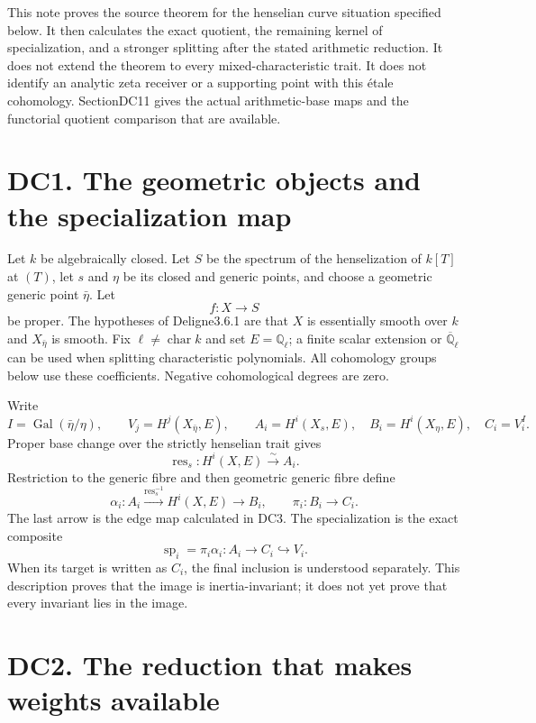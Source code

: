 \documentclass[
]{report}
\begin{document}
This note proves the source theorem for the henselian curve situation
specified below. It then calculates the exact quotient, the remaining
kernel of specialization, and a stronger splitting after the stated
arithmetic reduction. It does not extend the theorem to every
mixed-characteristic trait. It does not identify an analytic zeta
receiver or a supporting point with this étale cohomology. SectionDC11
gives the actual arithmetic-base maps and the functorial quotient
comparison that are available.

\section{DC1. The geometric objects and the specialization
map}\label{dc1.-the-geometric-objects-and-the-specialization-map}

Let \(k\) be algebraically closed. Let \(S\) be the spectrum of the
henselization of \(k[T]\) at \((T)\), let \(s\) and \(\eta\) be its
closed and generic points, and choose a geometric generic point
\(\bar\eta\). Let \[
f:X\longrightarrow S
\tag{DC1.1}
\] be proper. The hypotheses of Deligne3.6.1 are that \(X\) is
essentially smooth over \(k\) and \(X_{\bar\eta}\) is smooth. Fix
\(\ell\ne\operatorname{char}k\) and set \(E=\mathbb Q_\ell\); a finite
scalar extension or \(\overline{\mathbb Q}_\ell\) can be used when
splitting characteristic polynomials. All cohomology groups below use
these coefficients. Negative cohomological degrees are zero.

Write \[
I=\operatorname{Gal}(\bar\eta/\eta),\qquad
V_j=H^j(X_{\bar\eta},E),\qquad
A_i=H^i(X_s,E),\quad B_i=H^i(X_\eta,E),\quad C_i=V_i^I.
\tag{DC1.2}
\] Proper base change over the strictly henselian trait gives \[
\operatorname{res}_s:H^i(X,E)\xrightarrow{\sim}A_i.
\tag{DC1.3}
\] Restriction to the generic fibre and then geometric generic fibre
define \[
\alpha_i:A_i\xrightarrow{\operatorname{res}_s^{-1}}H^i(X,E)
 \longrightarrow B_i,
\qquad
\pi_i:B_i\longrightarrow C_i.
\tag{DC1.4}
\] The last arrow is the edge map calculated in DC3. The specialization
is the exact composite \[
\operatorname{sp}_i=\pi_i\alpha_i:A_i\longrightarrow C_i
 \hookrightarrow V_i.
\tag{DC1.5}
\] When its target is written as \(C_i\), the final inclusion is
understood separately. This description proves that the image is
inertia-invariant; it does not yet prove that every invariant lies in
the image.

\section{DC2. The reduction that makes weights
available}\label{dc2.-the-reduction-that-makes-weights-available}
\end{document}
